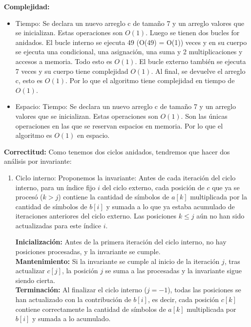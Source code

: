 \documentclass[12pt]{article}
\begin{document}
\begin{itemize}
\begin{algorithm}[H]
{        
    }
    \end{algorithm}
    \textbf{Complejidad:}
    \begin{itemize}
        \item Tiempo: Se declara un nuevo arreglo c de tamaño 7 y un arreglo valores que se inicializan. Estas operaciones son $O(1)$. Luego se tienen dos bucles for anidados. El bucle interno se ejecuta 49 (O(49) = O(1)) veces y en su cuerpo se ejecuta una condicional, una asignación, una suma y 2 multiplicaciones y accesos a memoria.
        Todo esto es $O(1)$. El bucle externo también se ejecuta 7 veces y su cuerpo tiene complejidad $O(1)$. Al final, se devuelve el arreglo c, esto es $O(1)$. Por lo que el algoritmo tiene complejidad en tiempo de $O(1)$.
        \item Espacio: Tiempo: Se declara un nuevo arreglo c de tamaño 7 y un arreglo valores que se inicializan. Estas operaciones son $O(1)$. Son las únicas operaciones en las que se reservan espacios en memoria. Por lo que el algoritmo es $O(1)$ en espacio.
    \end{itemize}

    \textbf{Correctitud:} Como tenemos dos ciclos anidados, tendremos que hacer dos análisis por invariante:
    \begin{enumerate}
        \item Ciclo interno:
        Proponemos la invariante: Antes de cada iteración del ciclo interno, para un índice fijo $i$ del ciclo externo, cada posición de $c$ que ya se procesó ($k > j$) contiene la cantidad de símbolos de $a[k]$ multiplicada por la cantidad de símbolos de $b[i]$ y sumada a lo que ya estaba acumulado de iteraciones anteriores del ciclo externo. Las posiciones $k \le j$ aún no han sido actualizadas para este índice $i$.

        \textbf{Inicialización:} Antes de la primera iteración del ciclo interno, no hay posiciones procesadas, y la invariante se cumple.\\
        \textbf{Mantenimiento:} Si la invariante se cumple al inicio de la iteración $j$, tras actualizar $c[j]$, la posición $j$ se suma a las procesadas y la invariante sigue siendo cierta.\\
        \textbf{Terminación:} Al finalizar el ciclo interno ($j=-1$), todas las posiciones se han actualizado con la contribución de $b[i]$, es decir, cada posición $c[k]$ contiene correctamente la cantidad de símbolos de $a[k]$ multiplicada por $b[i]$ y sumada a lo acumulado.


\end{enumerate}
\end{itemize}
\end{document}
